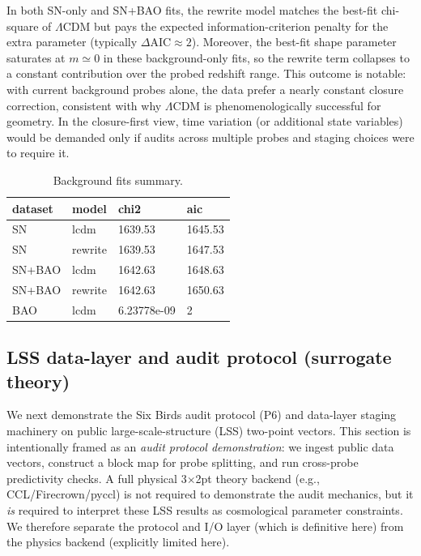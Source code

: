 \documentclass[11pt]{article}
\theoremstyle{definition}
\theoremstyle{plain}
\theoremstyle{remark}
\begin{document}
In both SN-only and SN+BAO fits, the rewrite model matches the best-fit chi-square of $\Lambda$CDM but pays the expected information-criterion penalty for the extra parameter (typically $\Delta\mathrm{AIC}\approx 2$).
Moreover, the best-fit shape parameter saturates at $m\simeq 0$ in these background-only fits, so the rewrite term collapses to a constant contribution over the probed redshift range.
This outcome is notable: with current background probes alone, the data prefer a nearly constant closure correction, consistent with why $\Lambda$CDM is phenomenologically successful for geometry.
In the closure-first view, time variation (or additional state variables) would be demanded only if audits across multiple probes and staging choices were to require it.

\begin{table}[t]
\centering
\caption{Background fits summary.}
\label{tab:background_fits}
\begin{tabular}{llll}
\toprule
 dataset & model & chi2 & aic \\
\midrule
 SN & lcdm & 1639.53 & 1645.53 \\
 SN & rewrite & 1639.53 & 1647.53 \\
 SN+BAO & lcdm & 1642.63 & 1648.63 \\
 SN+BAO & rewrite & 1642.63 & 1650.63 \\
 BAO & lcdm & 6.23778e-09 & 2 \\
\bottomrule
\end{tabular}
\end{table}
 
\subsection{LSS data-layer and audit protocol (surrogate theory)}\label{sec:results:lss}
We next demonstrate the Six Birds audit protocol (P6) and data-layer staging machinery on public large-scale-structure (LSS) two-point vectors.
This section is intentionally framed as an \emph{audit protocol demonstration}: we ingest public data vectors, construct a block map for probe splitting, and run cross-probe predictivity checks.
A full physical 3$\times$2pt theory backend (e.g., CCL/Firecrown/pyccl) is not required to demonstrate the audit mechanics, but it \emph{is} required to interpret these LSS results as cosmological parameter constraints.
We therefore separate the protocol and I/O layer (which is definitive here) from the physics backend (explicitly limited here).
\end{document}
